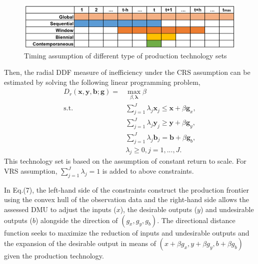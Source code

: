 \begin{figure}[ht]
    \centering
    \includegraphics[scale=0.65]{SJF2.pdf}
    \caption{Timing assumption of different type of production technology sets} 
    \label{fig_time}
\end{figure}


Then, the radial DDF measure of inefficiency under the CRS assumption can be estimated by solving the following linear programming problem,
\begin{equation}\begin{split}\label{eq_eff_r}
    D_r (\pmb{x},\pmb{y},\pmb{b};\pmb{g}) 
    = &\max _{\beta,\pmb{\lambda}} \beta  \\ 
    \text{s.t.} &\sum\limits_{j = 1}^J {\lambda _j \pmb{x}_j \le \pmb{x} + \beta \pmb{g}_x}, \\ 
                &\sum\limits_{j = 1}^J {\lambda _j \pmb{y}_j \ge \pmb{y} + \beta \pmb{g}_y}, \\ 
                &\sum\limits_{j = 1}^J {\lambda _j \pmb{b}_j = \pmb{b} + \beta \pmb{g}_b}, \\ 
                &\lambda _j \ge 0, j = 1,...,J.
\end{split}\end{equation}
This technology set is based on the assumption of constant return to scale. For VRS assumption, $\sum_{j=1}^{J} \lambda_j =1$ is added to above constraints.

In Eq.(7), the left-hand side of the constraints construct the production frontier using the convex hull of the observation data and the right-hand side allows the assessed DMU to adjust the inputs ($x$), the desirable outputs ($y$) and undesirable outputs ($b$) alongside the direction of $(g_x,g_y,g_b)$. The directional distance function seeks to maximize the reduction of inputs and undesirable outputs and the expansion of the desirable output in means of $(x+\beta g_x, y+ \beta g_y, b+\beta g_b)$ given the production technology. 

